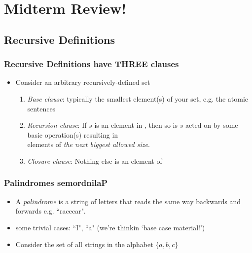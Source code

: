 ﻿%

\setcounter{section}{6}

\section{Midterm Review!}

\begin{frame}

\scriptsize{\tableofcontents}

\end{frame}

\subsection{Recursive Definitions}

\begin{frame}
\frametitle{Recursive Definitions have THREE clauses}

\begin{itemize}[<+->]

\item Consider an arbitrary recursively-defined set 

\bigskip

\begin{enumerate}
\item {\emph{Base clause}}: typically the smallest element(s) of your set, e.g. the atomic sentences

\item {\emph{Recursion clause}}: If $s$ is an element in , then so is $s$ acted on by some basic operation(s) resulting in \\ elements of \textit{the next biggest \emph{allowed} size}. 

\item {\emph{Closure clause}}: Nothing else is an element of 
\end{enumerate}

\end{itemize} 
\end{frame}

\begin{frame}
\frametitle{Palindromes  semordnilaP}

\begin{itemize}[<+->]
\item A \emph{palindrome} is a string of letters that reads the same way backwards and forwards e.g. ``racecar". 

\item  some trivial cases: ``I", ``a" (we're thinkin `base case material!')

\item Consider the set of all strings in the alphabet $\{a,b,c\}$ %


\end{itemize} 
\end{frame}

